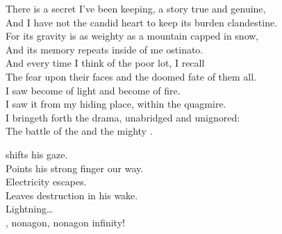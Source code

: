 






There is a secret I've been keeping, a story true and genuine, \\
And I have not the candid heart to keep its burden clandestine. \\

For its gravity is as weighty as a mountain capped in snow, \\
And its memory repeats inside of me ostinato. \\

And every time I think of the poor lot, I recall \\
The fear upon their faces and the doomed fate of them all. \\

I saw  become of light and  become of fire. \\
I saw it from my hiding place, within the quagmire. \\

I bringeth forth the drama, unabridged and unignored: \\
The battle of the  and the mighty . \\





 shifts his gaze. \\
Points his strong finger our way. \\
Electricity escapes. \\
Leaves destruction in his wake. \\

Lightning… \\

, nonagon, nonagon infinity! \\

